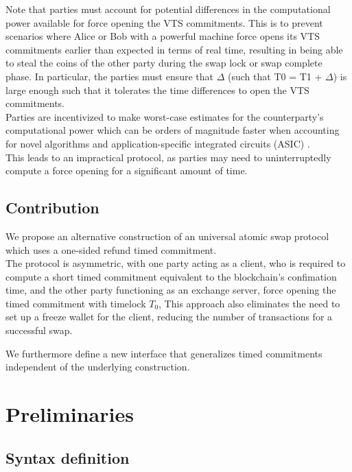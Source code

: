 \documentclass{article}      	%
\begin{document}
Note that parties must account for potential differences in the computational power available for force opening the VTS commitments. This is to prevent scenarios where Alice or Bob with a powerful machine force opens its VTS commitments earlier than expected in terms of real time, resulting in being able 
to steal the coins of the other party during the swap lock or swap complete phase. In particular, the parties must ensure that $\Delta$ (such that T0 = T1 + $\Delta$) is large enough such that it tolerates the time differences to open the VTS commitments. \\

Parties are incentivized to make worst-case estimates for the counterparty's computational power which can be orders of magnitude faster when accounting for novel algorithms \cite{squaring_algo} and application-specific integrated circuits (ASIC) \cite{squaring_asic}. \\
This leads to an impractical protocol, as parties may need to uninterruptedly compute a force opening for a significant amount of time.
\subsection{Contribution}

We propose an alternative construction of an universal atomic swap protocol which uses a one-sided refund timed commitment.  \\
The protocol is asymmetric, with one party acting as a client, who is required to compute a short timed commitment equivalent to the blockchain's confimation time, and the other party functioning as an exchange server, force opening the timed commitment with timelock $T_0$,
This approach also eliminates the need to set up a freeze wallet for the client, reducing the number of transactions for a successful swap.

We furthermore define a new interface that generalizes timed commitments independent of the underlying construction.

\section{Preliminaries}


\subsection{Syntax definition}
\end{document}
